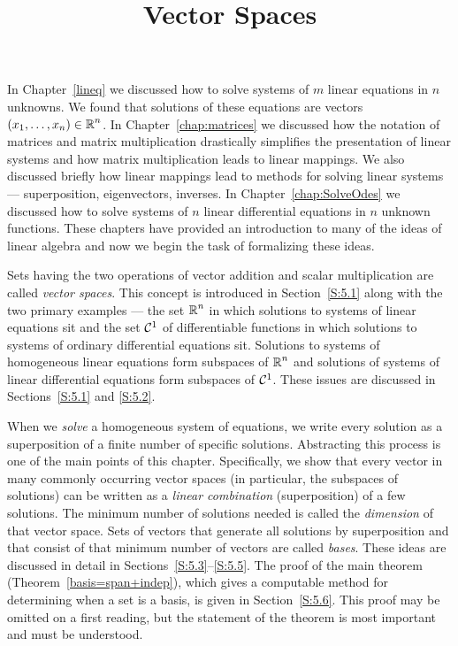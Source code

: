 \documentclass{ximera}
\title{Vector Spaces}
\begin{document}
\begin{abstract}
\end{abstract}
\maketitle

\normalsize

In Chapter~\ref{lineq} we discussed how to solve systems of $m$
linear equations in $n$ unknowns.  We found that solutions of
these equations are vectors $(x_1,\ldots,x_n)\in\mbox{$\Bbb{R}$}^n$.  
In Chapter~\ref{chap:matrices} we discussed how the notation of
matrices and matrix multiplication drastically simplifies the
presentation of linear systems and how matrix multiplication
leads to linear mappings.  We also discussed briefly how linear
mappings lead to methods for solving linear systems ---
superposition, eigenvectors, inverses.  In
Chapter~\ref{chap:SolveOdes} we discussed how to solve systems
of $n$ linear differential equations in $n$ unknown functions.
These chapters have
provided an introduction to many of the ideas of linear algebra
and now we begin the task of formalizing these ideas.

Sets having the two operations of vector addition and scalar
multiplication are called {\em vector spaces\/}.  This concept
is introduced in Section~\ref{S:5.1} along with the two
primary examples --- the set $\mbox{$\Bbb{R}$}^n$ in which solutions to systems
of linear equations sit and the set ${\cal C}^1$ of differentiable
functions in which solutions to systems of ordinary differential
equations sit.  Solutions to systems of homogeneous linear equations
form subspaces of $\mbox{$\Bbb{R}$}^n$ and solutions of systems of linear
differential equations form subspaces of ${\cal C}^1$.  These issues
are discussed in Sections~\ref{S:5.1} and \ref{S:5.2}.

When we {\em solve\/} a homogeneous system of equations, we write
every solution as a superposition of a finite number of specific
solutions.  Abstracting this process is one of the main points of this
chapter.  Specifically, we show that every vector in many commonly
occurring vector spaces
(in particular, the subspaces of solutions) can be written as a
{\em linear combination\/} (superposition) of a few 
solutions.  The minimum number of solutions needed is called
the {\em dimension\/} of that vector space.  Sets of vectors that 
generate all solutions by superposition and that consist of that minimum 
number of vectors are called {\em bases\/}.  These ideas are discussed
in detail in Sections~\ref{S:5.3}--\ref{S:5.5}.  The proof of
the main theorem (Theorem~\ref{basis=span+indep}), which gives a
computable method for determining when a set is a basis, is given in
Section~\ref{S:5.6}.  This proof may be omitted on a first reading,
but the statement of the theorem is most important and must be
understood.
\end{document}
